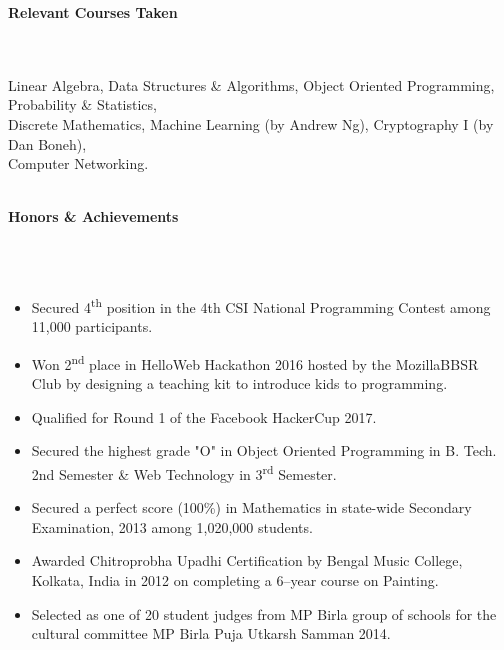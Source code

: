 \documentclass[a4paper,10pt]{article}
\newcommand{\lsep}{-0.5cm}
\newcommand{\resheading}[1]{{\large \colorbox{mygrey}{\begin{minipage}{0.99\textwidth}{\textbf{#1 \vphantom{p\^{E}}}}\end{minipage}}}}
\begin{document}
\resheading{\textbf{Relevant Courses Taken} }\\\\[\lsep]

\indent Linear Algebra, Data Structures \& Algorithms, Object Oriented Programming, Probability \& Statistics,\\
\indent Discrete Mathematics, Machine Learning (by Andrew Ng), Cryptography I (by Dan Boneh),\\
\indent Computer Networking.\\\\


\resheading{\textbf{Honors \& Achievements}}\\[\lsep]\\[-0.2cm]
\begin{itemize}
\item {Secured 4\textsuperscript{th} position in the 4th CSI National Programming Contest among 11,000 participants.}
\item {Won 2\textsuperscript{nd} place in HelloWeb Hackathon 2016 hosted by the MozillaBBSR Club by designing a teaching kit to introduce kids to programming.}
\item {Qualified for Round 1 of the Facebook HackerCup 2017.}
\item {Secured the highest grade "O" in Object Oriented Programming in B. Tech. 2nd Semester \& Web Technology in 3\textsuperscript{rd} Semester.}
\item {Secured a perfect score (100\%) in Mathematics in state-wide Secondary Examination, 2013 among 1,020,000 students.}
\item {Awarded Chitroprobha Upadhi Certification by Bengal Music College, Kolkata, India in 2012 on completing a 6--year course on Painting.}\item{Selected as one of 20 student judges from MP Birla group of schools for the cultural committee MP Birla Puja Utkarsh Samman 2014.}
\end{itemize}
\end{document}
